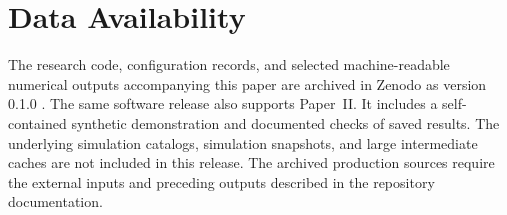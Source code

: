 \section*{Data Availability}

The research code, configuration records, and selected machine-readable numerical outputs accompanying this paper are archived in Zenodo as version 0.1.0 \citep{takeuchi2026diffusionbulkflowsoftware}. The same software release also supports Paper~II. It includes a self-contained synthetic demonstration and documented checks of saved results. The underlying simulation catalogs, simulation snapshots, and large intermediate caches are not included in this release. The archived production sources require the external inputs and preceding outputs described in the repository documentation.
